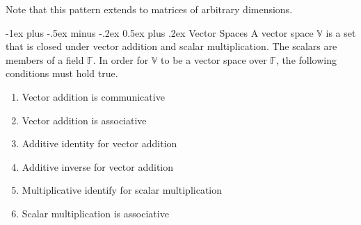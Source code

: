 \documentclass[10pt,landscape,letterpaper]{article}
\makeatletter
\renewcommand{\section}{\@startsection{section}{1}{0mm}%
                                {-1ex plus -.5ex minus -.2ex}%
                                {0.5ex plus .2ex}%
                                {\normalfont\large\bfseries}}
\newcommand{\bvec}[1]{\mathbf{#1}}
\newcommand{\vecspace}[1]{\mathbb{#1}}
\makeatother
\begin{document}
\begin{multicols}{3}
Note that this pattern extends to matrices of arbitrary dimensions.

\section{Vector Spaces}
A vector space $\vecspace{V}$ is a set that is closed under vector addition and scalar multiplication. The scalars are members of a field $\vecspace{F}$.
In order for $\vecspace{V}$ to be a vector space over $\vecspace{F}$, the following conditions must hold true.

\begin{enumerate}
    \item Vector addition is communicative
    \item Vector addition is associative
    
    \item Additive identity for vector addition
    
    \item Additive inverse for vector addition
    
    \item Multiplicative identify for scalar multiplication
    
    \item Scalar multiplication is associative
    

\end{enumerate}
\end{multicols}
\end{document}
